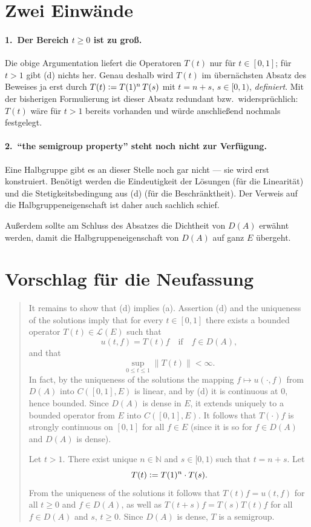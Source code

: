 \documentclass[11pt,a4paper]{article}
\newcommand{\LE}{\mathcal{L}(E)}
\newcommand{\N}{\mathbb{N}}
\providecommand{\coloneq}{\mathrel{\vcentcolon=}}
\begin{document}
\section*{Zwei Einwände}

\paragraph{1.\ Der Bereich $t \geq 0$ ist zu groß.}
Die obige Argumentation liefert die Operatoren $T(t)$ nur für
$t \in [0,1]$; für $t > 1$ gibt (d) nichts her. Genau deshalb wird
$T(t)$ im übernächsten Absatz des Beweises ja erst durch
$T(t) \coloneq T(1)^{n}\,T(s)$ mit $t = n+s$, $s \in [0,1)$,
\emph{definiert}. Mit der bisherigen Formulierung ist dieser Absatz
redundant bzw.\ widersprüchlich: $T(t)$ wäre für $t > 1$ bereits
vorhanden und würde anschließend nochmals festgelegt.

\paragraph{2.\ \enquote{the semigroup property} steht noch nicht zur Verfügung.}
Eine Halbgruppe gibt es an dieser Stelle noch gar nicht --- sie wird
erst konstruiert. Benötigt werden die Eindeutigkeit der Lösungen (für
die Linearität) und die Stetigkeitsbedingung aus (d) (für die
Beschränktheit). Der Verweis auf die Halbgruppeneigenschaft ist daher
auch sachlich schief.

Außerdem sollte am Schluss des Absatzes die Dichtheit von $D(A)$
erwähnt werden, damit die Halbgruppeneigenschaft von $D(A)$ auf ganz
$E$ übergeht.

\section*{Vorschlag für die Neufassung}

\begin{quote}
It remains to show that (d) implies (a).
Assertion (d) and the uniqueness of the solutions imply that for every
$t \in [0,1]$ there exists a bounded operator $T(t) \in \LE$ such that
\[
    u(t,f) = T(t)f
    \quad \text{if} \quad
    f \in D(A),
\]
and that
\[
    \sup_{0 \leq t \leq 1} \|T(t)\| < \infty .
\]
In fact, by the uniqueness of the solutions the mapping
$f \mapsto u(\cdot,f)$ from $D(A)$ into $C([0,1],E)$ is linear, and by
(d) it is continuous at $0$, hence bounded. Since $D(A)$ is dense in
$E$, it extends uniquely to a bounded operator from $E$ into
$C([0,1],E)$.
It follows that $T(\cdot)f$ is strongly continuous on $[0,1]$ for all
$f \in E$ (since it is so for $f \in D(A)$ and $D(A)$ is dense).

Let $t > 1$.
There exist unique $n \in \N$ and $s \in [0,1)$ such that $t = n+s$.
Let
\[
    T(t) \coloneq T(1)^{n} \cdot T(s) .
\]
From the uniqueness of the solutions it follows that $T(t)f = u(t,f)$
for all $t \geq 0$ and $f \in D(A)$, as well as
$T(t+s)f = T(s)T(t)f$ for all $f \in D(A)$ and $s$, $t \geq 0$.
Since $D(A)$ is dense, $T$ is a semigroup.
\end{quote}
\end{document}
